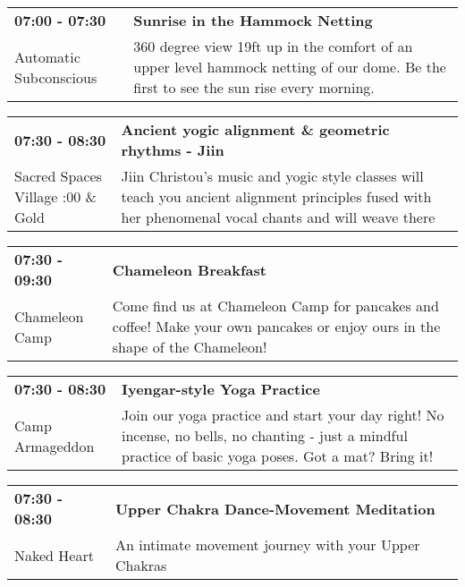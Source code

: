 \begin{tabular}{ p{1in} p{2.2in} }
    \textbf{07:00 - 07:30} & \textbf{Sunrise in the Hammock Netting} \\
    Automatic Subconscious \newline  & 360 degree view 19ft up in the comfort of an upper level hammock netting of our dome. Be the first to see the sun rise every morning. \\
    \hline 
\end{tabular}
    
\begin{tabular}{ p{1in} p{2.2in} }
    \textbf{07:30 - 08:30} & \textbf{Ancient yogic alignment \& geometric rhythms - Jiin} \\
    Sacred Spaces Village \newline 4:00 \& Gold & Jiin Christou's  music and yogic style classes will teach you ancient alignment principles fused with her phenomenal vocal chants and will weave there \\
    \hline 
\end{tabular}
    
\begin{tabular}{ p{1in} p{2.2in} }
    \textbf{07:30 - 09:30} & \textbf{Chameleon Breakfast} \\
    Chameleon Camp \newline  & Come find us at Chameleon Camp for pancakes and coffee! Make your own pancakes or enjoy ours in the shape of the Chameleon! \\
    \hline 
\end{tabular}
    
\begin{tabular}{ p{1in} p{2.2in} }
    \textbf{07:30 - 08:30} & \textbf{Iyengar-style Yoga Practice} \\
    Camp Armageddon \newline  & Join our yoga practice and start your day right! No incense, no bells, no chanting - just a mindful practice of basic yoga poses. Got a mat? Bring it! \\
    \hline 
\end{tabular}
    
\begin{tabular}{ p{1in} p{2.2in} }
    \textbf{07:30 - 08:30} & \textbf{Upper Chakra Dance-Movement Meditation} \\
    Naked Heart \newline  & An intimate movement journey with your Upper Chakras \\
    \hline 
\end{tabular}
    
